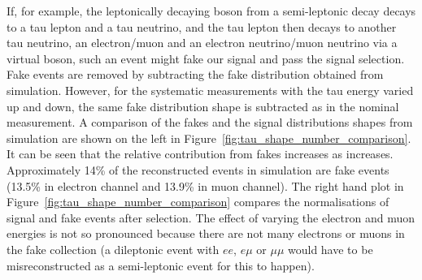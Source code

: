 If, for example, the leptonically decaying \W boson from a semi-leptonic \ttbar decay decays to a tau lepton
and a tau neutrino, and the tau lepton then decays to another tau neutrino, an electron/muon and an electron
neutrino/muon neutrino via a virtual \W boson, such an event might fake our signal and pass the \ttbar signal
selection. Fake events are removed by subtracting the fake distribution obtained from simulation. However, for
the systematic measurements with the tau energy varied up and down, the same fake distribution shape is
subtracted as in the nominal measurement. A comparison of the fakes and the signal \met distributions shapes
from \ttbar simulation are shown on the left in Figure~\ref{fig:tau_shape_number_comparison}.
It can be seen that the relative contribution from fakes increases as \met increases. Approximately 14\% of
the reconstructed \ttbar events in simulation are fake events (13.5\% in electron channel and 13.9\% in muon
channel). The right hand plot in Figure~\ref{fig:tau_shape_number_comparison} compares the normalisations of
signal and fake events after selection. The effect of varying the electron and muon energies is not so
pronounced because there are not many electrons or muons in the fake collection (a dileptonic \ttbar event
with $ee$, $e\mu$ or $\mu\mu$ would have to be misreconstructed as a semi-leptonic event for this to happen).

